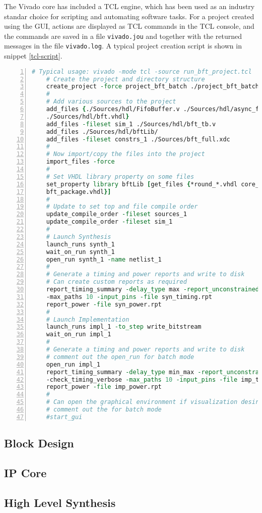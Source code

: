 The Vivado core has included a TCL engine, which has been used as an industry standar choice for scripting and automating software tasks. For a project created using the GUI, actions are displayed as TCL commands in the TCL console, and the commands are saved in a file \texttt{vivado.jou} and together with the returned messages in the file \texttt{vivado.log}. A typical project creation script is shown in snippet \ref{tcl-script}.

\begin{lstlisting}[language=tcl, basicstyle=\scriptsize\ttfamily, tabsize=2, commentstyle=\color{darkgray}, keywordstyle=\color{blue}, backgroundcolor=\color{lightgray}, morekeywords={create_project, add_files, import_files, set_property, update_compile_order, launch_runs, wait_on_run, open_run, report_timming_summary, report_power}, breaklines=true, numbers=left, float=htb, caption={TCL project creation example, from \ref{UG895}}, label={tcl-script}]
	# Typical usage: vivado -mode tcl -source run_bft_project.tcl
	# Create the project and directory structure
	create_project -force project_bft_batch ./project_bft_batch -part xc7z010-clg225-1
	#
	# Add various sources to the project
	add_files {./Sources/hdl/FifoBuffer.v ./Sources/hdl/async_fifo.v \
	./Sources/hdl/bft.vhdl}
	add_files -fileset sim_1 ./Sources/hdl/bft_tb.v
	add_files ./Sources/hdl/bftLib/
	add_files -fileset constrs_1 ./Sources/bft_full.xdc
	#
	# Now import/copy the files into the project
	import_files -force
	#
	# Set VHDL library property on some files
	set_property library bftLib [get_files {*round_*.vhdl core_transform.vhdl \
	bft_package.vhdl}]
	#
	# Update to set top and file compile order
	update_compile_order -fileset sources_1
	update_compile_order -fileset sim_1
	#
	# Launch Synthesis
	launch_runs synth_1
	wait_on_run synth_1
	open_run synth_1 -name netlist_1
	#
	# Generate a timing and power reports and write to disk
	# Can create custom reports as required
	report_timing_summary -delay_type max -report_unconstrained -check_timing_verbose \
	-max_paths 10 -input_pins -file syn_timing.rpt
	report_power -file syn_power.rpt
	#
	# Launch Implementation
	launch_runs impl_1 -to_step write_bitstream
	wait_on_run impl_1
	#
	# Generate a timing and power reports and write to disk
	# comment out the open_run for batch mode
	open_run impl_1
	report_timing_summary -delay_type min_max -report_unconstrained \
	-check_timing_verbose -max_paths 10 -input_pins -file imp_timing.rpt
	report_power -file imp_power.rpt
	#
	# Can open the graphical environment if visualization desired
	# comment out the for batch mode
	#start_gui
\end{lstlisting}

\subsection{Block Design}


\subsection{IP Core}

\subsection{High Level Synthesis}

